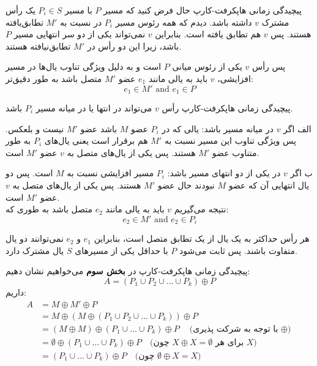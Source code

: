 \begin{itemframe}{‌پیچیدگی زمانی هاپکرفت-کارپ}
\itm
 حال فرض کنید که مسیر $P$ با مسیر $P_i \in S$ یک رأس مشترک $v$ داشته باشد. دیدم که همه رئوس مسیر $P_i$ در نسبت به $M'$‌ تطابق‌یافته هستند. پس $v$ هم تطابق یافته است.
\itm
بنابراین $v$ نمی‌تواند یکی از دو سر انتهایی مسیر $P$ باشد، زیرا این دو رأس در $M'$ تطابق‌نیافته هستند.

پس رأس $v$ یکی از رئوس میانی $P$ است و به دلیل ویژگی تناوب یال‌ها در مسیر افزایشی، $v$ باید به یالی مانند
$e_1$
عضو $M'$ متصل باشد به طور دقیق‌تر:
$$e_1 \in M' \text{ and } e_1 \in P$$

\end{itemframe}

\begin{itemframe}{‌پیچیدگی زمانی هاپکرفت-کارپ}
\decLineSpace
\itm
رأس $v$ می‌تواند در انتها یا در میانه مسیر $P_i$ باشد.
\item[الف]
اگر $v$ در میانه مسیر باشد: یالی که در $P_i$ عضو  $M$ باشد عضو $M'$ نیست و بلعکس. پس ویژگی تناوب این مسیر نسبت به $M'$ هم برقرار است یعنی یال‌های $P_i$ به طور متناوب عضو $M'$ هستند. پس یکی از یال‌های متصل به $v$ عضو $M'$ است.
\item[ب]
اگر $v$ در یکی از دو انتهای مسیر باشد: $P_i$ مسیر افزایشی نسبت به $M$ است. پس دو یال انتهایی آن که عضو $M$ نبودند حال عضو $M'$ هستند. پس یکی از یال‌های متصل به $v$ عضو $M'$ است.\\
\itm
نتیجه می‌گیریم $v$ باید به یالی مانند
$e_2$
 متصل باشد به طوری که:
$$e_2 \in M' \text{ and } e_2 \in P_i$$


\itm
هر رأس حداکثر به یک یال از یک تطابق متصل است، بنابراین
$e_1$
و
$e_2$
نمی‌توانند دو یال متفاوت باشند. پس ثابت می‌شود $P$ با حداقل یکی از مسیرهای $S$ یال مشترک دارد.
\end{itemframe}

\begin{itemframe}{‌پیچیدگی زمانی هاپکرفت-کارپ}
\itm
در \textbf{بخش سوم} می‌خواهیم نشان دهیم:
$$
A = (P_1 \cup P_2 \cup \dots \cup P_k) \oplus P
$$
\itm
داریم:
\begin{align*}
A &= M \oplus M' \oplus P \\
& = M \oplus (M \oplus (P_1 \cup P_2 \cup \dots \cup P_k)) \oplus P \\
&= (M \oplus M) \oplus (P_1 \cup \dots \cup P_k) \oplus P \quad
\text{(با توجه به شرکت پذیری $\oplus$)} \\
&= \emptyset \oplus (P_1 \cup \dots \cup P_k) \oplus P \quad
\text{(چون $X \oplus X = \emptyset$ برای هر $X$)} \\
&= (P_1 \cup \dots \cup P_k) \oplus P \quad
\text{(چون $\emptyset \oplus X = X$)}
\end{align*}

\end{itemframe}

